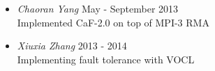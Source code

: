 \begin{itemize}
    \item{\sl Chaoran Yang} \hfill May - September 2013 \\
        Implemented CaF-2.0 on top of MPI-3 RMA \\
    \item{\sl Xiuxia Zhang} \hfill 2013 - 2014 \\
        Implementing fault tolerance with VOCL \\
\end{itemize}

